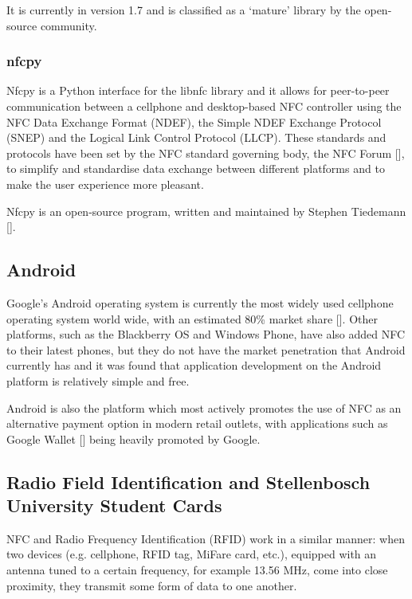 It is currently in version 1.7 and is classified as a `mature' library by the
open-source community.

\subsubsection{nfcpy}
\label{sec:nfcpy}

Nfcpy is a Python interface for the libnfc library and it allows for peer-to-peer communication
between a cellphone and desktop-based NFC controller using the NFC Data Exchange Format
(NDEF), the Simple NDEF Exchange Protocol (SNEP) and the Logical Link Control Protocol (LLCP).
These standards and protocols have been set by the NFC standard governing body, the NFC Forum
[\cite{website:nfc-forum}], to simplify and standardise data exchange between different
platforms and to make the user experience more pleasant.

Nfcpy is an open-source program, written and maintained by Stephen Tiedemann
[\cite{website:nfcpy}].

\subsection{Android}

Google's Android operating system is currently the most widely used cellphone operating
system world wide, with an estimated 80\% market share
[\cite{article:android-marketshare}].
Other platforms, such as the Blackberry OS and Windows Phone, have also added NFC to their
latest phones, but they do not have the market penetration that Android currently has and it
was found that application development on the Android platform is relatively simple and free.

Android is also the platform which most actively promotes the use of NFC as an
alternative payment option in modern retail outlets, with applications such as Google Wallet
[\cite{article:android-wallet}] being heavily promoted by Google.

\subsection{Radio Field Identification and Stellenbosch
University Student Cards}

NFC and Radio Frequency Identification (RFID) work in a similar manner: when two
devices  (e.g. cellphone, RFID tag, MiFare card, etc.), equipped with an antenna
tuned to a certain frequency, for example 13.56 MHz, come into close
proximity, they transmit some form of data to one another.

